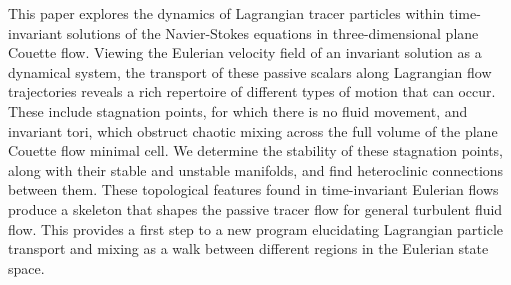 


This paper explores the dynamics of Lagrangian tracer particles within 
time-invariant solutions of the Navier-Stokes equations in three-dimensional 
plane Couette flow. Viewing the Eulerian velocity field of an invariant solution 
as a dynamical system, the transport of these passive scalars along Lagrangian 
flow trajectories reveals a rich repertoire of different types of motion that 
can occur. These include stagnation points, for which there is no fluid movement, 
and invariant tori, which obstruct chaotic mixing across the full volume of the 
plane Couette flow minimal cell. We determine the stability of these stagnation 
points, along with their stable and unstable manifolds, and find heteroclinic 
connections between them. These topological features found in time-invariant
Eulerian flows produce a skeleton that shapes the passive tracer flow for 
general turbulent fluid flow. This provides a first step to a new program elucidating 
Lagrangian particle transport and mixing as a walk between different regions in
the Eulerian state space. 

 

